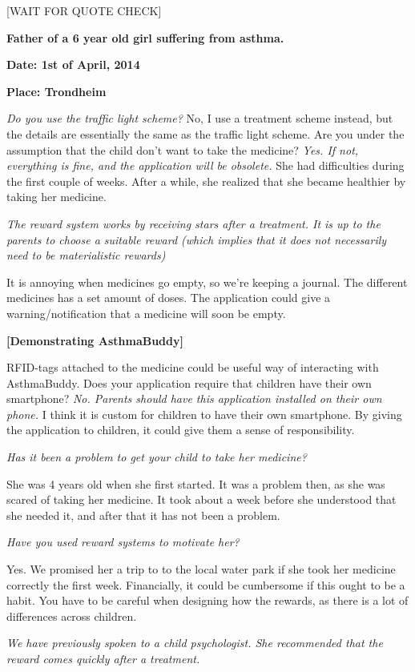 [WAIT FOR QUOTE CHECK]

\textbf{Father of a 6 year old girl suffering from asthma.}

\textbf{Date: 1st of April, 2014}

\textbf{Place: Trondheim}

\emph{Do you use the traffic light scheme?}
No, I use a treatment scheme instead, but the details are essentially the same as the traffic light scheme.
Are you under the assumption that the child don't want to take the medicine?
\emph{Yes. If not, everything is fine, and the application will be obsolete.}
She had difficulties during the first couple of weeks. After a while, she realized that she became healthier by taking her medicine. 

\emph{The reward system works by receiving stars after a treatment. It is up to the parents to choose a suitable reward (which implies that it does not necessarily need to be materialistic rewards)}

It is annoying when medicines go empty, so we're keeping a journal. The different medicines has a set amount of doses. The application could give a warning/notification that a medicine will soon be empty. 

\textbf{[Demonstrating AsthmaBuddy]} 

RFID-tags attached to the medicine could be useful way of interacting with AsthmaBuddy. 
Does your application require that children have their own smartphone?
\emph{No. Parents should have this application installed on their own phone.} 
I think it is custom for children to have their own smartphone. By giving the application to children, it could give them a sense of responsibility. 

\emph{Has it been a problem to get your child to take her medicine?}

She was 4 years old when she first started. It was a problem then, as she was scared of taking her medicine. It took about a week before she understood that she needed it, and after that it has not been a problem.

\emph{Have you used reward systems to motivate her?}

Yes. We promised her a trip to to the local water park if she took her medicine correctly the first week. Financially, it could be cumbersome if this ought to be a habit. You have to be careful when designing how the rewards, as there is a lot of differences across children. 

\emph{We have previously spoken to a child psychologist. She recommended that the reward comes quickly after a treatment.}

